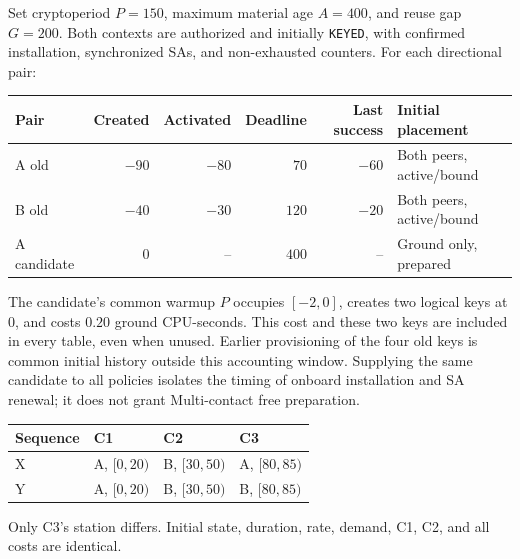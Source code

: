 \documentclass[11pt,a4paper]{article}
\newcommand{\act}[1]{\texttt{#1}}
\begin{document}
Set cryptoperiod $P=150$, maximum material age $A=400$, and reuse gap $G=200$. Both contexts are authorized and initially \act{KEYED}, with confirmed installation, synchronized SAs, and non-exhausted counters. For each directional pair:
\begin{center}
\begin{tabular}{@{}lrrrrl@{}}
\toprule
Pair & Created & Activated & Deadline & Last success & Initial placement\\
\midrule
A old & $-90$ & $-80$ & $70$ & $-60$ & Both peers, active/bound\\
B old & $-40$ & $-30$ & $120$ & $-20$ & Both peers, active/bound\\
A candidate & $0$ & -- & $400$ & -- & Ground only, prepared\\
\bottomrule
\end{tabular}
\end{center}
The candidate's common warmup $P$ occupies $[-2,0]$, creates two logical keys at $0$, and costs $0.20$ ground CPU-seconds. This cost and these two keys are included in every table, even when unused. Earlier provisioning of the four old keys is common initial history outside this accounting window. Supplying the same candidate to all policies isolates the timing of onboard installation and SA renewal; it does not grant Multi-contact free preparation.

\begin{center}
\begin{tabular}{@{}llll@{}}
\toprule
Sequence & C1 & C2 & C3\\
\midrule
X & A, $[0,20)$ & B, $[30,50)$ & A, $[80,85)$\\
Y & A, $[0,20)$ & B, $[30,50)$ & B, $[80,85)$\\
\bottomrule
\end{tabular}
\end{center}
Only C3's station differs. Initial state, duration, rate, demand, C1, C2, and all costs are identical.
\end{document}
